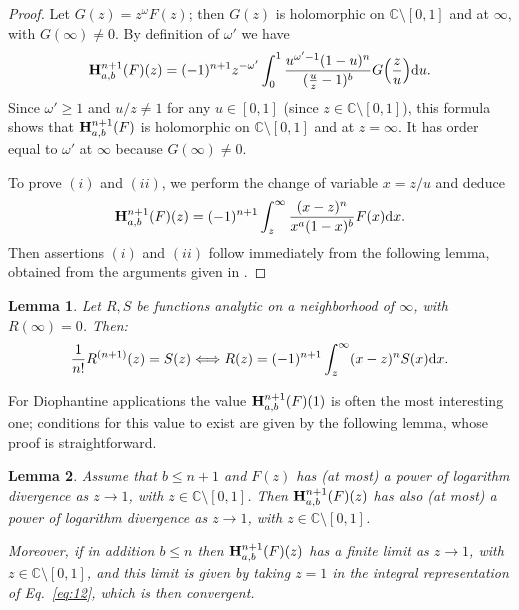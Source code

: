 \documentclass[reqno,12pt]{amsart}
\numberwithin{equation}{section}
\newtheorem{lem}{Lemma}
\theoremstyle{remark}
\def\dd{\textup{d}}
\newcommand{\C}{\mathbb{C}}
\newcommand{\BBB}{{\bf H}}
\begin{document}
\begin{proof}  Let $G(z) = z^\omega F(z)$; then $G(z)$ is holomorphic on $\C\setminus [0,1]$ 
and at $\infty$, with $G(\infty)\neq 0$. By definition of $\omega'$ we have
$$\BBB_{a,b}^{n+1}(F)(z) = (-1)^{n+1}z^{-\omega' } \int_0^{1} \frac{u^{\omega'-1}(1-u)^n}{(\frac{u}{z}-1)^b}
G\Big(\frac zu\Big) \dd u .$$
Since $\omega'\geq 1$ and $u/z \neq 1$ for any $u\in [0,1]$ (since $z\in\C \setminus[0,1]$), 
this formula shows that   $\BBB_{a,b}^{n+1}(F)$ is holomorphic on $\C\setminus[0,1]$ and at $z=\infty$. 
It has order equal to $\omega'$ at $\infty$ because $G(\infty)\neq 0$. 

To prove $(i)$ and $(ii)$, we perform the change of variable $x = z/u$ and deduce
$$\BBB_{a,b}^{n+1}(F)(z) =(-1)^{n+1} \int_z^{\infty} \frac{(x-z)^n}{x^a(1-x)^b}F(x) \dd x .$$
Then assertions $(i)$ and $(ii)$ follow immediately from the following lemma, obtained from the arguments 
given in \cite[p. 60]{sh}.
\end{proof}


\begin{lem} \label{lem:7anc} Let $R, S$ be functions analytic on a neighborhood of $\infty$, with $R(\infty)=0$. Then:
$$
\frac{1}{n!}R^{(n+1)}(z)=S(z) \Longleftrightarrow R(z)=(-1)^{n+1}\int_z^{\infty} (x-z)^{n}S(x) \dd x.
$$
\end{lem}

\bigskip

For Diophantine applications the value $\BBB_{a,b}^{n+1}(F)(1)$ is often the most interesting one; conditions for 
this value to exist are given by the following lemma, whose proof is straightforward.

\begin{lem} \label{lemenun}
Assume that $b\leq n+1$ and $F(z)$ has (at most) a power of logarithm divergence as $z\to 1$, with 
$z\in\C\setminus[0,1]$. Then  $\BBB_{a,b}^{n+1}(F)(z)$ has also  (at most) a power of logarithm 
divergence as $z\to 1$, with $z\in\C\setminus[0,1]$. 

Moreover, if in addition $b\leq n$ then  $\BBB_{a,b}^{n+1}(F)(z)$ has a finite limit as $z\to 1$, 
with $z\in\C\setminus[0,1]$, and this limit is given by taking $z=1$ in the integral representation 
of Eq.~\eqref{eq:12}, which is then convergent.
\end{lem}
\end{document}
